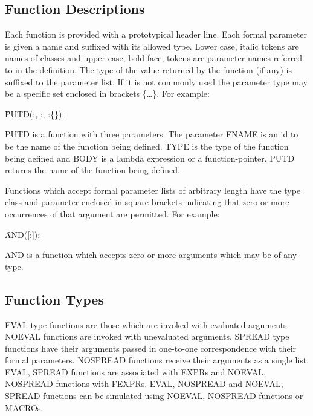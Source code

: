 \subsection{Function Descriptions}

Each function is provided with a prototypical header line. Each formal
parameter is given a name and suffixed with its allowed type.  Lower
case, italic tokens are names of classes and upper case, bold face,
tokens are parameter names referred to in the definition. The type of
the value returned by the function (if any) is suffixed to the
parameter list.  If it is not commonly used the parameter type may be
a specific set enclosed in brackets \{\ldots\}.  For example:


\vspace{.1in}
\noindent \f{PUTD}(:, :,
:\{\}):
\vspace{.1in}

PUTD is a function with three parameters. The parameter FNAME is an id
to be the name of the function being defined. TYPE is the type of the
function being defined and BODY is a lambda expression or a
function-pointer. PUTD returns the name of the function being defined.



Functions which accept formal parameter lists of arbitrary length have
the type class and parameter enclosed in square brackets indicating
that zero or more occurrences of that argument are permitted.
 For example:

\vspace{.1in}
\noindent \f{AND}([:]):
\vspace{.1in}

AND is a function which accepts zero or more arguments which may be of
any type.

\subsection{Function Types}

EVAL type functions are those which are invoked with evaluated
arguments. NOEVAL functions are invoked with unevaluated arguments.
SPREAD type functions have their arguments passed in one-to-one
correspondence with their formal parameters. NOSPREAD functions
receive their arguments as a single list. EVAL, SPREAD functions are
associated with EXPRs and NO\-EVAL, NO\-SPREAD functions with FEXPRs.
EVAL, NO\-SPREAD and NOEVAL, SPREAD functions can be simulated using
NOEVAL, NO\-SPREAD functions or MACROs. 

